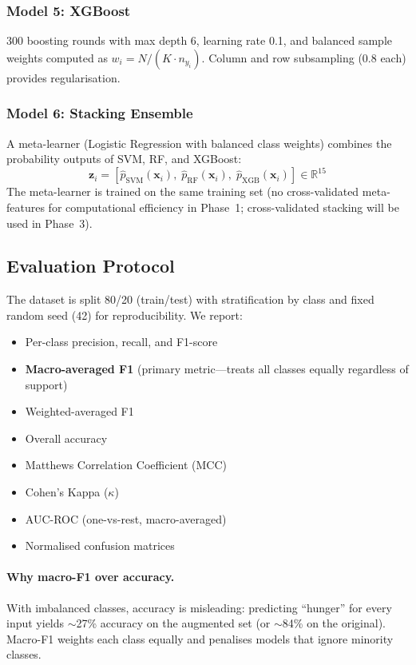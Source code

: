 \documentclass[11pt,a4paper]{article}
\begin{document}
\subsubsection{Model 5: XGBoost}

300 boosting rounds with max depth 6, learning rate 0.1, and balanced
sample weights computed as $w_i = N / (K \cdot n_{y_i})$. Column and
row subsampling (0.8 each) provides regularisation.

\subsubsection{Model 6: Stacking Ensemble}

A meta-learner (Logistic Regression with balanced class weights)
combines the probability outputs of SVM, RF, and XGBoost:
\begin{equation}
  \mathbf{z}_i = [\hat{p}_{\text{SVM}}(\mathbf{x}_i),\;
                   \hat{p}_{\text{RF}}(\mathbf{x}_i),\;
                   \hat{p}_{\text{XGB}}(\mathbf{x}_i)] \in \mathbb{R}^{15}
\end{equation}
The meta-learner is trained on the same training set (no cross-validated
meta-features for computational efficiency in Phase~1; cross-validated
stacking will be used in Phase~3).

\subsection{Evaluation Protocol}
\label{sec:eval_protocol}

The dataset is split 80/20 (train/test) with stratification by class
and fixed random seed (42) for reproducibility. We report:
\begin{itemize}[nosep]
  \item Per-class precision, recall, and F1-score
  \item \textbf{Macro-averaged F1} (primary metric---treats all classes
        equally regardless of support)
  \item Weighted-averaged F1
  \item Overall accuracy
  \item Matthews Correlation Coefficient (MCC)
  \item Cohen's Kappa ($\kappa$)
  \item AUC-ROC (one-vs-rest, macro-averaged)
  \item Normalised confusion matrices
\end{itemize}

\paragraph{Why macro-F1 over accuracy.}
With imbalanced classes, accuracy is misleading: predicting ``hunger''
for every input yields $\sim$27\% accuracy on the augmented set
(or $\sim$84\% on the original). Macro-F1 weights each class equally
and penalises models that ignore minority classes.
\end{document}
